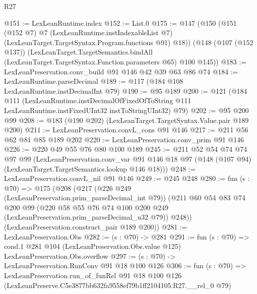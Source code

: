 \begin{lexlean}{R27}
\begin{coremodule}
@151 := LexLeanRuntime.index
@152 := List.{0}
@175 := @147
    (@150
      (@151
        (@152 @7)
        @7
        (LexLeanRuntime.instIndexableList @7)
        (LexLeanTarget.TargetSyntax.Program.functions @91)
        @18))
    (@148
      (@107 (@152 @137))
      (LexLeanTarget.TargetSemantics.bindAll
        (LexLeanTarget.TargetSyntax.Function.parameters @65)
        @100
        @145))
@183 := LexLeanPreservation.conv_build @91 @146 @42 @39 @63 @86 @74
@184 := LexLeanRuntime.parseDecimal
@189 := @117 (@184 @108 LexLeanRuntime.instDecimalInt @79)
@190 := @95 @189
@200 := @121
    (@184
      @111
      (LexLeanRuntime.instDecimalOfFixedOfToString
        @111
        LexLeanRuntime.instFixedUInt32
        instToStringUInt32)
      @79)
@202 := @95 @200 @99
@208 := @183 (@190 @202) (LexLeanTarget.TargetSyntax.Value.pair @189 @200)
@211 := LexLeanPreservation.convL_cons @91 @146
@217 := @211 @56 @62 @81 @85 @189 @202
@220 := LexLeanPreservation.conv_prim @91 @146
@226 := @220 @49 @55 @76 @80 @100 @189
@245 := @211
    @52
    @54
    @74
    @74
    @97
    @99
    (LexLeanPreservation.conv_var
      @91
      @146
      @18
      @97
      (@148 (@107 @94) (LexLeanTarget.TargetSemantics.lookup @146 @18)))
@248 := LexLeanPreservation.convL_nil @91 @146
@249 := @245 @248
@280 := fun (s : @70) =>
  @175
    (@208
      (@217
        (@226 @249 (LexLeanPreservation.prim_parseDecimal_int @79))
        (@211
          @60
          @54
          @83
          @74
          @200
          @99
          (@220 @58 @55 @76 @74 @100 @200 @249 (LexLeanPreservation.prim_parseDecimal_u32 @79))
          @248))
      (LexLeanPreservation.construct_pair @189 @200))
@281 := LexLeanPreservation.Obs
@282 := (s : @70) -> @281
@291 := fun (s : @70) =>
  cond.{1} @281 @104 (LexLeanPreservation.Obs.value @125) LexLeanPreservation.Obs.overflow
@297 := (s : @70) -> LexLeanPreservation.RunConv @91 @18 @100 @126
@306 := fun (s : @70) =>
  LexLeanPreservation.run_of_funRel
    @91
    @18
    @100
    @126
    (LexLeanPreserve.C5e3877bb632fa9558ef79b1ff2104105.R27.__rel_0 @79)
\end{coremodule}
\end{lexlean}
